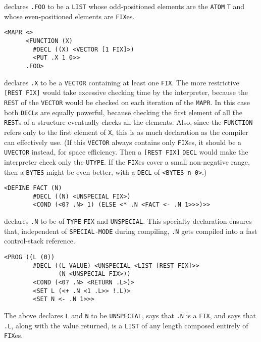 \documentclass[a4paper]{scrbook}
\begin{document}
declares \texttt{.FOO} to be a \texttt{LIST} whose odd-positioned elements are the \texttt{ATOM} \texttt{T} and whose
even-positioned elements are \texttt{FIX}es.

\begin{verbatim}
<MAPR <>
      <FUNCTION (X)
        #DECL ((X) <VECTOR [1 FIX]>)
        <PUT .X 1 0>>
      .FOO>
\end{verbatim}

declares \texttt{.X} to be a \texttt{VECTOR} containing at least one \texttt{FIX}. The more restrictive
\texttt{{[}REST\ FIX{]}} would take excessive checking time by the interpreter, because the \texttt{REST} of the
\texttt{VECTOR} would be checked on each iteration of the \texttt{MAPR}. In this case both \texttt{DECL}s are equally
powerful, because checking the first element of all the \texttt{REST}s of a structure eventually checks all the elements.
Also, since the \texttt{FUNCTION} refers only to the first element of \texttt{X}, this is as much declaration as the
compiler can effectively use. (If this \texttt{VECTOR} always contains only \texttt{FIX}es, it should be a \texttt{UVECTOR}
instead, for space efficiency. Then a \texttt{{[}REST\ FIX{]}} \texttt{DECL} would make the interpreter check only the
\texttt{UTYPE}. If the \texttt{FIX}es cover a small non-negative range, then a \texttt{BYTES} might be even better, with a
\texttt{DECL} of \texttt{\textless{}BYTES\ n\ 0\textgreater{}}.)

\begin{verbatim}
<DEFINE FACT (N)
        #DECL ((N) <UNSPECIAL FIX>)
        <COND (<0? .N> 1) (ELSE <* .N <FACT <- .N 1>>>)>>
\end{verbatim}

declares \texttt{.N} to be of \texttt{TYPE} \texttt{FIX} and \texttt{UNSPECIAL}. This specialty declaration ensures that,
independent of \texttt{SPECIAL-MODE} during compiling, \texttt{.N} gets compiled into a fast control-stack reference.

\begin{verbatim}
<PROG ((L (0))
        #DECL ((L VALUE) <UNSPECIAL <LIST [REST FIX]>>
               (N <UNSPECIAL FIX>))
        <COND (<0? .N> <RETURN .L>)>
        <SET L (<+ .N <1 .L>> !.L)>
        <SET N <- .N 1>>>
\end{verbatim}

The above declares \texttt{L} and \texttt{N} to be \texttt{UNSPECIAL}, says that \texttt{.N} is a \texttt{FIX}, and says
that \texttt{.L}, along with the value returned, is a \texttt{LIST} of any length composed entirely of \texttt{FIX}es.
\end{document}
